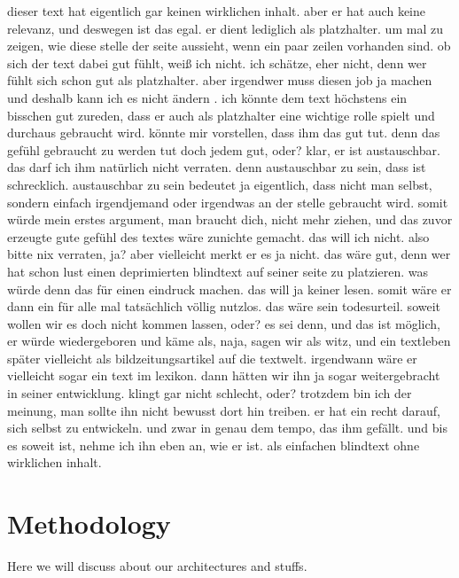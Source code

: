 \documentclass[conference]{IEEEtran}
\begin{document}
dieser text hat eigentlich gar keinen wirklichen inhalt. aber er hat auch keine relevanz, und deswegen ist das egal. er dient lediglich als platzhalter. um mal zu zeigen, wie diese stelle der seite aussieht, wenn ein paar zeilen vorhanden sind. ob sich der text dabei gut fühlt, weiß ich nicht. ich schätze, eher nicht, denn wer fühlt sich schon gut als platzhalter. aber irgendwer muss diesen job ja machen und deshalb kann ich es nicht ändern . ich könnte dem text höchstens ein bisschen gut zureden, dass er auch als platzhalter eine wichtige rolle spielt und durchaus gebraucht wird. könnte mir vorstellen, dass ihm das gut tut. denn das gefühl gebraucht zu werden tut doch jedem gut, oder? klar, er ist austauschbar. das darf ich ihm natürlich nicht verraten. denn austauschbar zu sein, dass ist schrecklich. austauschbar zu sein bedeutet ja eigentlich, dass nicht man selbst, sondern einfach irgendjemand oder irgendwas an der stelle gebraucht wird. somit würde mein erstes argument, man braucht dich, nicht mehr ziehen, und das zuvor erzeugte gute gefühl des textes wäre zunichte gemacht. das will ich nicht. also bitte nix verraten, ja? aber vielleicht merkt er es ja nicht. das wäre gut, denn wer hat schon lust einen deprimierten blindtext auf seiner seite zu platzieren. was würde denn das für einen eindruck machen. das will ja keiner lesen. somit wäre er dann ein für alle mal tatsächlich völlig nutzlos. das wäre sein todesurteil. soweit wollen wir es doch nicht kommen lassen, oder? es sei denn, und das ist möglich, er würde wiedergeboren und käme als, naja, sagen wir als witz, und ein textleben später vielleicht als bildzeitungsartikel auf die textwelt. irgendwann wäre er vielleicht sogar ein text im lexikon. dann hätten wir ihn ja sogar weitergebracht in seiner entwicklung. klingt gar nicht schlecht, oder? trotzdem bin ich der meinung, man sollte ihn nicht bewusst dort hin treiben. er hat ein recht darauf, sich selbst zu entwickeln. und zwar in genau dem tempo, das ihm gefällt. und bis es soweit ist, nehme ich ihn eben an, wie er ist. als einfachen blindtext ohne wirklichen inhalt.

\section{Methodology}
Here we will  discuss about our architectures and stuffs.
\end{document}
